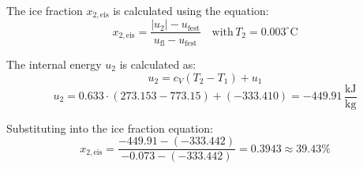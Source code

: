 The ice fraction \( x_{2,\text{eis}} \) is calculated using the equation:  
\[
x_{2,\text{eis}} = \frac{|u_2| - u_{\text{fest}}}{u_{\text{fl}} - u_{\text{fest}}} \quad \text{with} \, T_2 = 0.003^\circ\text{C}
\]  

The internal energy \( u_2 \) is calculated as:  
\[
u_2 = c_V (T_2 - T_1) + u_1
\]  
\[
u_2 = 0.633 \cdot (273.153 - 773.15) + (-333.410) = -449.91 \, \frac{\text{kJ}}{\text{kg}}
\]  

Substituting into the ice fraction equation:  
\[
x_{2,\text{eis}} = \frac{-449.91 - (-333.442)}{-0.073 - (-333.442)} = 0.3943 \approx 39.43\%
\]